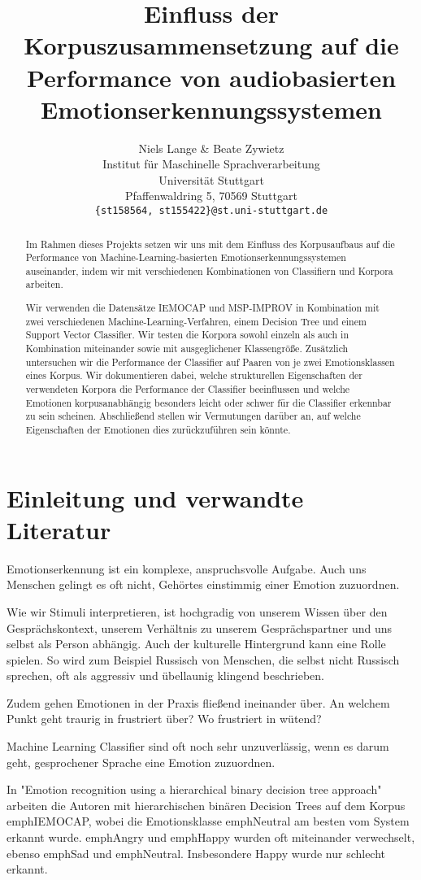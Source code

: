 \documentclass{article} %
\title{Einfluss der Korpuszusammensetzung auf die Performance von audiobasierten Emotionserkennungssystemen}
\author{Niels Lange \& Beate Zywietz\\
Institut für Maschinelle Sprachverarbeitung\\
Universität Stuttgart\\
Pfaffenwaldring 5, 70569 Stuttgart \\
\texttt{\{st158564, st155422\}@st.uni-stuttgart.de} \\
}
\begin{document}
\maketitle
\begin{abstract}
Im Rahmen dieses Projekts setzen wir uns mit dem Einfluss des Korpusaufbaus auf die Performance von Machine-Learning-basierten Emotionserkennungssystemen auseinander, indem wir mit verschiedenen Kombinationen von Classifiern und Korpora arbeiten. 

Wir verwenden die Datensätze IEMOCAP und MSP-IMPROV in Kombination mit zwei verschiedenen Machine-Learning-Verfahren, einem Decision Tree und einem Support Vector Classifier. Wir testen die Korpora sowohl einzeln als auch in Kombination miteinander sowie mit ausgeglichener Klassengröße. Zusätzlich untersuchen wir die Performance der Classifier auf Paaren von je zwei Emotionsklassen eines Korpus. Wir dokumentieren dabei, welche strukturellen Eigenschaften der verwendeten Korpora die Performance der Classifier beeinflussen und welche Emotionen korpusanabhängig besonders leicht oder schwer für die Classifier erkennbar zu sein scheinen. Abschließend stellen wir Vermutungen darüber an, auf welche Eigenschaften der Emotionen dies zurückzuführen sein könnte. 
\end{abstract}

\section{Einleitung und verwandte Literatur}
Emotionserkennung ist ein komplexe, anspruchsvolle Aufgabe. Auch uns Menschen gelingt es oft nicht, Gehörtes einstimmig einer Emotion zuzuordnen. 

Wie wir Stimuli interpretieren, ist hochgradig von unserem Wissen über den Gesprächskontext, unserem Verhältnis zu unserem Gesprächspartner und uns selbst als Person abhängig. Auch der kulturelle Hintergrund kann eine Rolle spielen. So wird zum Beispiel Russisch von Menschen, die selbst nicht Russisch sprechen, oft als aggressiv und übellaunig klingend beschrieben. 

Zudem gehen Emotionen in der Praxis fließend ineinander über. An welchem Punkt geht traurig in frustriert über? Wo frustriert in wütend? 

Machine Learning Classifier sind oft noch sehr unzuverlässig, wenn es darum geht, gesprochener Sprache eine Emotion zuzuordnen. 

In "Emotion recognition using a hierarchical binary decision tree approach"\citep{binat} arbeiten die Autoren mit hierarchischen binären Decision Trees auf dem Korpus emph{IEMOCAP}, wobei die Emotionsklasse emph{Neutral} am besten vom System erkannt wurde. emph{Angry} und emph{Happy} wurden oft miteinander verwechselt, ebenso emph{Sad} und emph{Neutral}. Insbesondere Happy wurde nur schlecht erkannt. 
\end{document}
